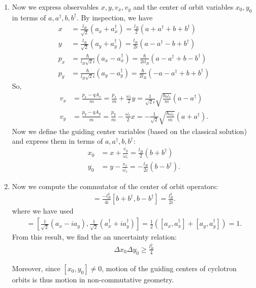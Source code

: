 \documentclass{article}
\theoremstyle{definition}
\newcommand{\f}[2]{\frac{#1}{#2}}
\newcommand{\lp}{\left(}
\newcommand{\rp}{\right)}
\newcommand{\lb}{\left[}
\newcommand{\rb}{\right]}
\begin{document}
\begin{enumerate}[label=\alph*)]
	\item Now we express observables $x,y,v_x,v_y$ and the center of orbit variables $x_0,y_0$ in terms of $a,a^\dagger,b,b^\dagger$. By inspection, we have
	\begin{align*}
	x &= \f{l_B}{\sqrt{2}}(a_x + a_x^\dagger) = \f{l_B}{2}(a+a^\dagger + b + b^\dagger) \\
	y &= \f{l_B}{\sqrt{2}}(a_y + a_y^\dagger) = \f{l_B}{2i}(a-a^\dagger - b + b^\dagger) \\
	p_x &= \f{\hbar}{l_B\sqrt{2}i} (a_x - a_x^\dagger) = \f{\hbar}{2i l_B } (a-a^\dagger + b - b^\dagger)\\
	p_y &= \f{\hbar}{l_B\sqrt{2}i} (a_y - a_y^\dagger) = \f{\hbar}{2l_B } (-a -a^\dagger + b + b^\dagger)
	\end{align*}
	So, 
	\begin{align*}
	v_x &= \f{p_x - qA_x}{m} = \f{p_x}{m} + \f{\omega_c}{2}y = \f{1}{\sqrt{2} i} \sqrt{\f{\hbar \omega_c}{m}} (a - a^\dagger) \\
	v_y &= \f{p_y - qA_y}{m} = \f{p_y}{m} - \f{\omega_c}{2}x = -\f{1}{\sqrt{2}} \sqrt{\f{\hbar \omega_c}{m}} ( a + a^\dagger).
	\end{align*}
	Now we define the guiding center variables (based on the classical solution) and express them in terms of $a,a^\dagger,b,b^\dagger$:
	\begin{align*}
	x_0 &= x + \f{v_y}{\omega_c} = \f{l_B}{2}(b+b^\dagger)\\
	y_0 &= y - \f{v_x}{\omega_c} = -\f{l_B}{2i}(b-b^\dagger).
	\end{align*}
	
	
	\item Now we compute the commutator of the center of orbit operators:
	\begin{align*}
	[x_0, y_0] = \f{-l_B^2}{4i}[b+b^\dagger, b -b^\dagger] = \f{l_B^2}{2i}.
	\end{align*}
	where we have used 
	\begin{align*}
		[b,b^\dagger] = \lb \f{1}{\sqrt{2}}(a_x - ia_y), \f{1}{\sqrt{2}} (a_x^\dagger + ia_y^\dagger) \rb  = \f{1}{2}\lp [a_x,a_x^\dagger] + [a_y,  a_y^\dagger] \rp = 1.
	\end{align*}
	From this result, we find the an uncertainty relation:
	\begin{align*}
		\Delta x_0 \Delta y_0 \geq \f{l_B^2}{4}
	\end{align*}


	Moreover, since $[x_0,y_0] \neq 0$, motion of the guiding centers of cyclotron orbits is thus motion in non-commutative geometry.\\
	

\end{enumerate}
\end{document}
